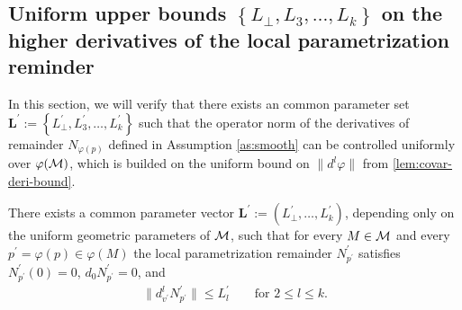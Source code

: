 \subsection{Uniform upper bounds  \texorpdfstring{$\left\{L_{\perp},L_3,\dots,L_k\right\}$}{L\_perp,L\_3, \dots, L\_k} on the higher derivatives of the local parametrization reminder}
\label{sec:phim-L}

In this section, we will verify that there exists an common parameter set $\textbf{L}^\prime:=\left\{L_{\perp}^\prime,L_3^\prime,\dots,L_k^\prime\right\}$ such that the operator norm of the derivatives of remainder $N_{\varphi(p)}$ defined in Assumption \ref{as:smooth} can be controlled uniformly over $\varphi(\mathcal{M})$, which is builded on the uniform bound on $\|d^l \varphi\|$ from \cref{lem:covar-deri-bound}.

\begin{lemma}
	\label{lem:remainder-bound}
	There exists a common parameter vector $\textbf{L}^\prime:=\left(L_\perp^\prime,\dots,L_k^\prime\right)$, depending only on the uniform geometric parameters of $\mathcal{M}$, such that for every $M \in \mathcal{M}$ and every $p^\prime=\varphi(p) \in \varphi(M)$ the local parametrization remainder $N^\prime_{p^\prime}$ satisfies $N^\prime_{p^\prime}(0)=0$, $d_0 N^\prime_{p^\prime}=0$, and
	\begin{align}
		\|d^l_{v^\prime} N^\prime_{p^\prime}\| \leq L_l^\prime \qquad \text{for } 2 \leq l \leq k.
	\end{align}
\end{lemma}

